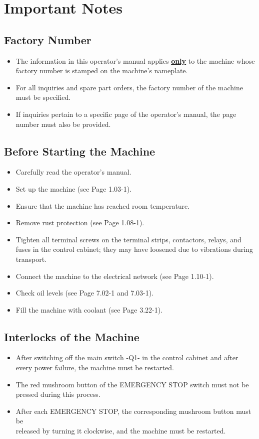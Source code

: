
\section{Important Notes}

\subsection{Factory Number}
\begin{itemize}
    \item The information in this operator's manual applies \uline{\textbf{only}} to the machine whose factory number is stamped on the machine's nameplate.
    \item For all inquiries and spare part orders, the factory number of the machine must be specified.
    \item If inquiries pertain to a specific page of the operator's manual, the page number must also be provided.
\end{itemize}

\subsection{Before Starting the Machine}
\begin{itemize}
    \item Carefully read the operator's manual.
    \item Set up the machine (see Page 1.03-1).
    \item Ensure that the machine has reached room temperature.
    \item Remove rust protection (see Page 1.08-1).
    \item Tighten all terminal screws on the terminal strips, contactors, relays, and fuses in the control cabinet; they may have loosened due to vibrations during transport.
    \item Connect the machine to the electrical network (see Page 1.10-1).
    \item Check oil levels (see Page 7.02-1 and 7.03-1).
    \item Fill the machine with coolant (see Page 3.22-1).
\end{itemize}

\subsection{Interlocks of the Machine}
\begin{itemize}
    \item After switching off the main switch -Q1- in the control cabinet and after every power failure, the machine must be restarted.\footnotemark[1]
    \item The red mushroom button of the EMERGENCY STOP switch must not be pressed during this process.
    \item After each EMERGENCY STOP, the corresponding mushroom button must be \\released by turning it clockwise, and the machine must be restarted.\textsuperscript{\footnotemark[1]}
\end{itemize}

